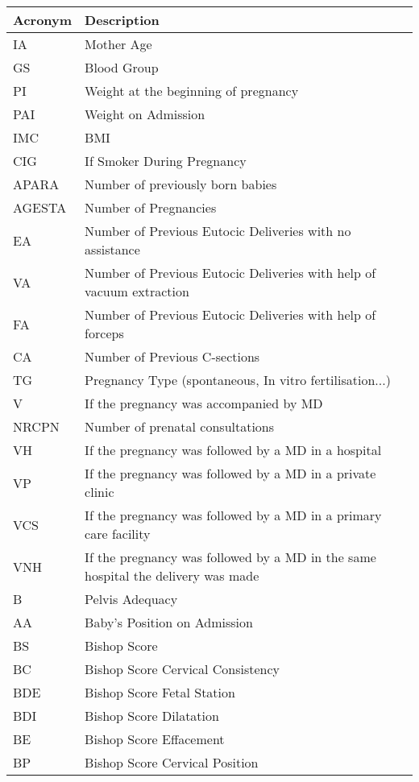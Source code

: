 \begin{table}[H]
\renewcommand{\arraystretch}{0.58}
\begin{tabular}{ l   l }

\toprule
Acronym  &    Description \\
\midrule
IA &  Mother Age \\
GS  & Blood Group \\
PI &   Weight at the beginning of pregnancy \\
PAI &  Weight on Admission \\
IMC &   BMI \\
CIG &   If Smoker During Pregnancy \\
APARA  & Number of previously born babies\\
AGESTA  &   Number of Pregnancies   \\
EA &     Number of Previous Eutocic Deliveries with no assistance \\
VA &      Number of Previous Eutocic Deliveries with help of vacuum extraction \\
FA &     Number of Previous Eutocic Deliveries with help of forceps \\
CA &   Number of  Previous C-sections \\
TG &     Pregnancy Type (spontaneous, In vitro fertilisation...) \\
V &     If the pregnancy was accompanied by MD \\
NRCPN &     Number of prenatal consultations \\
VH &      If the pregnancy was followed by a MD in a hospital \\
VP &    If the pregnancy was followed by a MD in a private clinic \\
VCS &  If the pregnancy was followed by a MD in a primary care facility \\
VNH &    If the pregnancy was followed by a MD in the same hospital the delivery was made \\
B  & Pelvis Adequacy \\
AA & Baby's Position on Admission \\
BS &  Bishop Score \\
BC &   Bishop Score Cervical Consistency\\
BDE &  Bishop Score Fetal Station \\
BDI &  Bishop Score Dilatation \\
BE  &   Bishop Score Effacement \\
BP & Bishop Score Cervical Position \\

\end{tabular}
\end{table}
